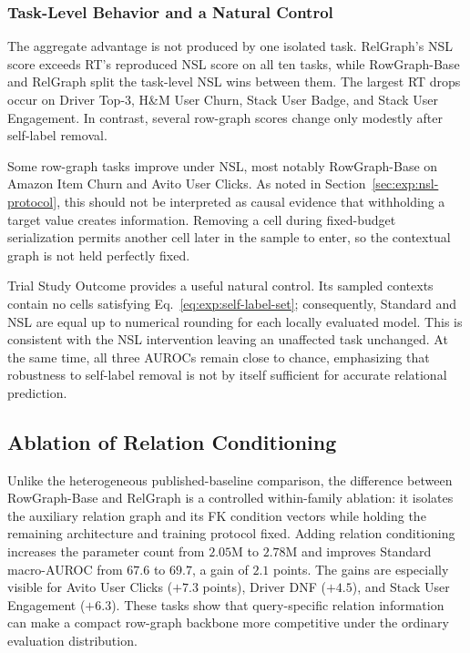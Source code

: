 \subsubsection{Task-Level Behavior and a Natural Control}
\label{sec:exp:nsl-task-level}

The aggregate advantage is not produced by one isolated task. RelGraph's
NSL score exceeds RT's reproduced NSL score on all ten tasks, while
RowGraph-Base and RelGraph split the task-level NSL wins between them. The
largest RT drops occur on Driver Top-3, H\&M User Churn, Stack User Badge,
and Stack User Engagement. In contrast, several row-graph scores change
only modestly after self-label removal.

Some row-graph tasks improve under NSL, most notably RowGraph-Base on Amazon
Item Churn and Avito User Clicks. As noted in
Section~\ref{sec:exp:nsl-protocol}, this should not be interpreted as causal
evidence that withholding a target value creates information. Removing a
cell during fixed-budget serialization permits another cell later in the
sample to enter, so the contextual graph is not held perfectly fixed.

Trial Study Outcome provides a useful natural control. Its sampled contexts
contain no cells satisfying Eq.~\eqref{eq:exp:self-label-set}; consequently,
Standard and NSL are equal up to numerical rounding for each locally
evaluated model. This is consistent with the NSL intervention leaving an
unaffected task unchanged. At the same time, all three AUROCs remain close
to chance, emphasizing that robustness to self-label removal is not by
itself sufficient for accurate relational prediction.

\subsection{Ablation of Relation Conditioning}
\label{sec:exp:relation-ablation}

Unlike the heterogeneous published-baseline comparison, the difference
between RowGraph-Base and RelGraph is a controlled within-family ablation:
it isolates the auxiliary relation graph and its FK condition vectors while
holding the remaining architecture and training protocol fixed. Adding
relation conditioning
increases the parameter count from \(2.05\)M to \(2.78\)M and improves
Standard macro-AUROC from \(67.6\) to \(69.7\), a gain of \(2.1\) points.
The gains are especially visible for Avito User Clicks
(\(+7.3\) points), Driver DNF (\(+4.5\)), and Stack User Engagement
(\(+6.3\)). These tasks show that query-specific relation information can
make a compact row-graph backbone more competitive under the ordinary
evaluation distribution.

